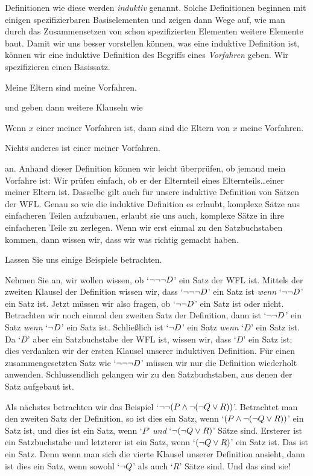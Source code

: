 Definitionen wie diese werden \emph{induktiv} genannt. Solche Definitionen beginnen mit einigen spezifizierbaren Basiselementen und zeigen dann Wege auf, wie man durch das Zusammensetzen von schon spezifizierten Elementen weitere Elemente baut. Damit wir uns besser vorstellen können, was eine induktive Definition ist, können wir eine induktive Definition des Begriffs eines \emph{Vorfahren} geben. Wir spezifizieren einen Basissatz.
	\begin{ebullet}
		\item Meine Eltern sind meine Vorfahren.
	\end{ebullet}
und geben dann weitere Klauseln wie
	\begin{ebullet}
		\item Wenn $x$ einer meiner Vorfahren ist, dann sind die Eltern von $x$ meine Vorfahren.
		\item Nichts anderes ist einer meiner Vorfahren.
	\end{ebullet}
an. Anhand dieser Definition können wir leicht überprüfen, ob jemand mein Vorfahre ist: Wir prüfen einfach, ob er der Elternteil eines Elternteils\dots einer meiner Eltern ist. Dasselbe gilt auch für unsere induktive Definition von Sätzen der WFL. Genau so wie die induktive Definition es erlaubt, komplexe Sätze aus einfacheren Teilen aufzubauen, erlaubt sie uns auch, komplexe Sätze in ihre einfacheren Teile zu zerlegen. Wenn wir erst einmal zu den Satzbuchstaben kommen, dann wissen wir, dass wir was richtig gemacht haben. 

Lassen Sie uns einige Beispiele betrachten.

Nehmen Sie an, wir wollen wissen, ob `$\neg \neg \neg D$' ein Satz der WFL ist. Mittels der zweiten Klausel der Definition wissen wir, dass `$\neg \neg \neg D$' ein Satz ist \emph{wenn} `$\neg \neg D$' ein Satz ist. Jetzt müssen wir also fragen, ob `$\neg \neg D$' ein Satz ist oder nicht. Betrachten wir noch einmal den zweiten Satz der Definition, dann ist `$\neg \neg D$' ein Satz \emph{wenn} `$\neg D$' ein Satz ist. Schlie{\ss}lich ist `$\neg D$' ein Satz \emph{wenn} `$D$' ein Satz ist. Da `$D$' aber ein Satzbuchstabe der WFL ist, wissen wir, dass `$D$' ein Satz ist; dies verdanken wir der ersten Klausel unserer induktiven Definition. Für einen zusammengesetzten Satz wie `$\neg \neg \neg D$' müssen wir nur die Definition wiederholt anwenden. Schlussendlich gelangen wir zu den Satzbuchstaben, aus denen der Satz aufgebaut ist.

Als nächstes betrachten wir das Beispiel `$\neg \neg (P \wedge \neg (\neg Q \vee R))$'. Betrachtet man den zweiten Satz der Definition, so ist dies ein Satz, wenn `$(P \wedge \neg (\neg Q \vee R))$' ein Satz ist, und dies ist ein Satz, wenn `$P$' \emph{und} `$\neg (\neg Q \vee R)$' Sätze sind. Ersterer ist ein Satzbuchstabe und letzterer ist ein Satz, wenn `$(\neg Q \vee R)$' ein Satz ist. Das ist ein Satz. Denn wenn man sich die vierte Klausel unserer Definition ansieht, dann ist dies ein Satz, wenn sowohl `$\neg Q$' als auch `$R$' Sätze sind. Und das sind sie!

